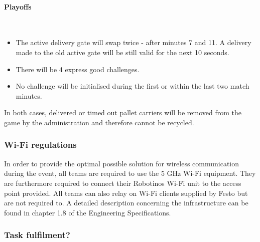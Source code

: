 \documentclass[12pt,twoside]{article}
\begin{document}
\paragraph{Playoffs}~\\
\begin{itemize}
\item The active delivery gate will swap twice - after minutes 7
  and 11. A delivery made to the old active gate will be still
  valid for the next 10 seconds.
\item There will be 4 express good challenges. 
\item No challenge will be initialised during the first or within
  the last two match minutes.
\end{itemize}
     

In both cases, delivered or timed out pallet carriers will be removed
from the game by the administration and therefore cannot be recycled.

\subsubsection{Wi-Fi regulations}

In order to provide the optimal possible solution for wireless
communication during the event, all teams are required to use the 5
GHz Wi-Fi equipment. They are furthermore required to connect their
Robotinos Wi-Fi unit to the access point provided. All teams can also
relay on Wi-Fi clients supplied by Festo but are not required to. A
detailed description concerning the infrastructure can be found in
chapter 1.8 of the Engineering Specifications.


\subsubsection{Task fulfilment?}
\end{document}
